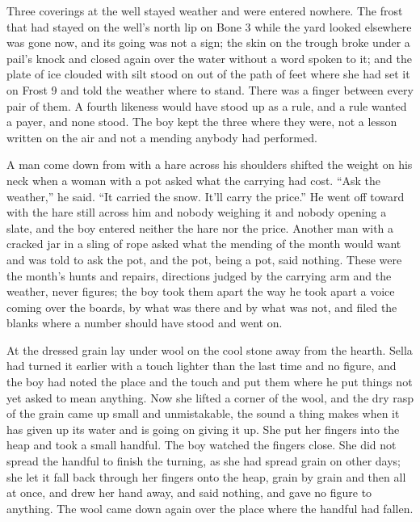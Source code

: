 Three coverings at the well stayed weather and were entered nowhere. The frost that had stayed on the well's north lip on Bone 3 while the yard looked elsewhere was gone now, and its going was not a sign; the skin on the trough broke under a pail's knock and closed again over the water without a word spoken to it; and the plate of ice clouded with silt stood on  out of the path of feet where she had set it on Frost 9 and told the weather where to stand. There was a finger between every pair of them. A fourth likeness would have stood up as a rule, and a rule wanted a payer, and none stood. The boy kept the three where they were, not a lesson written on the air and not a mending anybody had performed.

A man come down from  with a hare across his shoulders shifted the weight on his neck when a woman with a pot asked what the carrying had cost. “Ask the weather,” he said. “It carried the snow. It'll carry the price.” He went off toward  with the hare still across him and nobody weighing it and nobody opening a slate, and the boy entered neither the hare nor the price. Another man with a cracked jar in a sling of rope asked what the mending of the month would want and was told to ask the pot, and the pot, being a pot, said nothing. These were the month's hunts and repairs, directions judged by the carrying arm and the weather, never figures; the boy took them apart the way he took apart a voice coming over the boards, by what was there and by what was not, and filed the blanks where a number should have stood and went on.

\scenebreak

At  the dressed grain lay under wool on the cool stone away from the hearth. Sella had turned it earlier with a touch lighter than the last time and no figure, and the boy had noted the place and the touch and put them where he put things not yet asked to mean anything. Now she lifted a corner of the wool, and the dry rasp of the grain came up small and unmistakable, the sound a thing makes when it has given up its water and is going on giving it up. She put her fingers into the heap and took a small handful. The boy watched the fingers close. She did not spread the handful to finish the turning, as she had spread grain on other days; she let it fall back through her fingers onto the heap, grain by grain and then all at once, and drew her hand away, and said nothing, and gave no figure to anything. The wool came down again over the place where the handful had fallen.

